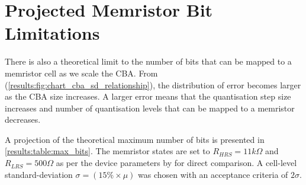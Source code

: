 \section{Projected Memristor Bit Limitations}

There is also a theoretical limit to the number of bits that can be mapped to a memristor cell as we scale the {CBA}. From (\autoref{results:fig:chart_cba_sd_relationship}), the distribution of error becomes larger as the CBA size increases. A larger error means that the quantisation step size increases and number of quantisation levels that can be mapped to a memristor decreases.

\noindent
A projection of the theoretical maximum number of bits is presented in \autoref{results:table:max_bits}. The memristor states are set to $R_{HRS} = 11 k\Omega$ and $R_{LRS} = 500 \Omega$ as per the device parameters by \citet{PengGu2015} \cite{PengGu2015} for direct comparison. A cell-level standard-deviation $\sigma = (15\% \times \mu)$ was chosen with an acceptance criteria of $2\sigma$.

